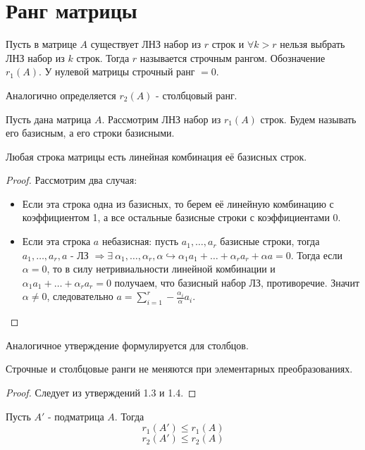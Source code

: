 \section{Ранг матрицы}
\label{Ранг матрицы.}
\begin{definition}
    Пусть в матрице $A$ существует ЛНЗ набор из $r$ строк и $\forall k>r$ нельзя выбрать ЛНЗ набор из $k$ строк. Тогда $r$ называется строчным рангом. Обозначение $r_1 (A)$. У нулевой матрицы строчный ранг $= 0$. 
\end{definition}
\begin{note}
    Аналогично определяется $r_2 (A)$ - столбцовый ранг.
\end{note}
\begin{definition}
    Пусть дана матрица $A$. Рассмотрим ЛНЗ набор из $r_1 (A)$ строк. Будем называть его базисным, а его строки базисными.
\end{definition}
\begin{theorem}
    Любая строка матрицы есть линейная комбинация её базисных строк.
\end{theorem}
\begin{proof}
    Рассмотрим два случая:
    \begin{itemize}
        \item Если эта строка одна из базисных, то берем её линейную комбинацию с коэффициентом 1, а все остальные базисные строки с коэффициентами 0.
        \item Если эта строка $a$ небазисная:  пусть $a_1, \dots, a_r$ базисные строки, тогда $a_1, \dots, a_r, a$ - ЛЗ $\Rightarrow \exists\ \alpha_1 , \dots, \alpha_r, \alpha \hookrightarrow \alpha_1 a_1 + \dots + \alpha_r a_r + \alpha a = 0$. Тогда если $\alpha = 0$, то в силу нетривиальности линейной комбинации и $\alpha_1 a_1 + \dots + \alpha_r a_r = 0$ получаем, что базисный набор ЛЗ, противоречие. Значит $\alpha \neq 0$, следовательно $a=\sum_{i=1}^{r}-\frac{\alpha_i}{\alpha} a_i$.
    \end{itemize}
\end{proof}
\begin{note}
    Аналогичное утверждение формулируется для столбцов.
\end{note}
\begin{proposition}
    Строчные и столбцовые ранги не меняются при элементарных преобразованиях.
\end{proposition}
\begin{proof}
    Следует из утверждений 1.3 и 1.4.
\end{proof}
\begin{proposition}
    Пусть $A'$ - подматрица $A$. Тогда $$r_1(A') \leqslant r_1(A)$$ $$r_2(A') \leqslant r_2(A)$$
\end{proposition}
